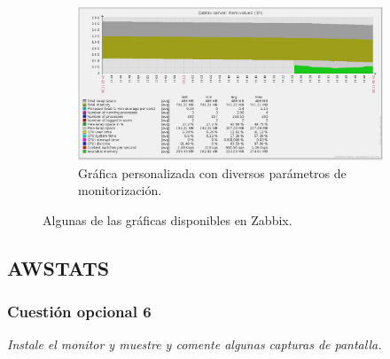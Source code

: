 \begin{figure}[H]
\begin{subfigure}[b]{0.5\linewidth}
    \centering
    \includegraphics[width=0.95\linewidth]{imagenes/g4} 
    \caption{Gráfica personalizada con diversos parámetros de monitorización.} 
  \end{subfigure} 
  \caption{Algunas de las gráficas disponibles en Zabbix. }
  \label{fig39} 
\end{figure}


\subsection{AWSTATS}
\subsubsection{Cuestión opcional 6}
\textit{Instale el monitor y muestre y comente algunas capturas de pantalla.}

